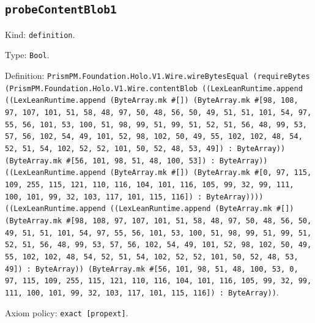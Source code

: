 \documentclass[11pt]{article}
\begin{document}
\subsection*{\texttt{probeContentBlob1}}
\noindent Kind: \texttt{definition}.\par
\noindent Type: \texttt{Bool}.\par
\noindent Definition: \texttt{PrismPM.Foundation.Holo.V1.Wire.wireBytesEqual (requireBytes (PrismPM.Foundation.Holo.V1.Wire.contentBlob ((LexLeanRuntime.append ((LexLeanRuntime.append (ByteArray.mk \#[]) (ByteArray.mk \#[98, 108, 97, 107, 101, 51, 58, 48, 97, 50, 48, 56, 50, 49, 51, 51, 101, 54, 97, 55, 56, 101, 53, 100, 51, 98, 99, 51, 99, 51, 52, 51, 56, 48, 99, 53, 57, 56, 102, 54, 49, 101, 52, 98, 102, 50, 49, 55, 102, 102, 48, 54, 52, 51, 54, 102, 52, 52, 101, 50, 52, 48, 53, 49]) : ByteArray)) (ByteArray.mk \#[56, 101, 98, 51, 48, 100, 53]) : ByteArray)) ((LexLeanRuntime.append (ByteArray.mk \#[]) (ByteArray.mk \#[0, 97, 115, 109, 255, 115, 121, 110, 116, 104, 101, 116, 105, 99, 32, 99, 111, 100, 101, 99, 32, 103, 117, 101, 115, 116]) : ByteArray)))) ((LexLeanRuntime.append ((LexLeanRuntime.append (ByteArray.mk \#[]) (ByteArray.mk \#[98, 108, 97, 107, 101, 51, 58, 48, 97, 50, 48, 56, 50, 49, 51, 51, 101, 54, 97, 55, 56, 101, 53, 100, 51, 98, 99, 51, 99, 51, 52, 51, 56, 48, 99, 53, 57, 56, 102, 54, 49, 101, 52, 98, 102, 50, 49, 55, 102, 102, 48, 54, 52, 51, 54, 102, 52, 52, 101, 50, 52, 48, 53, 49]) : ByteArray)) (ByteArray.mk \#[56, 101, 98, 51, 48, 100, 53, 0, 97, 115, 109, 255, 115, 121, 110, 116, 104, 101, 116, 105, 99, 32, 99, 111, 100, 101, 99, 32, 103, 117, 101, 115, 116]) : ByteArray))}.\par
\noindent Axiom policy: \texttt{exact [propext]}.\par
\end{document}
